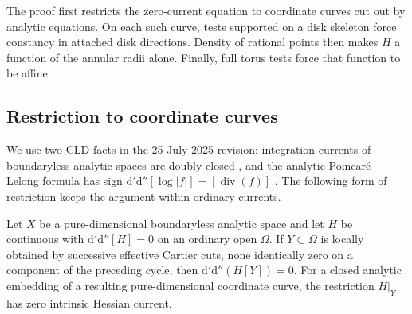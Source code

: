 The proof first restricts the zero-current equation to coordinate curves cut out by analytic equations. On each such curve, tests supported on a disk skeleton force constancy in attached disk directions. Density of rational points then makes $H$ a function of the annular radii alone. Finally, full torus tests force that function to be affine.

\subsection{Restriction to coordinate curves}\label{sec:supplied-p213-restriction}

We use two CLD facts in the 25 July 2025 revision: integration currents of boundaryless analytic spaces are doubly closed \cite[Proposition~7.7.9]{CLD25}, and the analytic Poincar\'e--Lelong formula has sign $\mathrm d'\mathrm d''[\log|f|]=[\operatorname{div}(f)]$ \cite[Theorem~16.7.3]{CLD25}. The following form of restriction keeps the argument within ordinary currents.

\begin{lemma}\label{lem:supplied-p213-cartier-restriction}
Let $X$ be a pure-dimensional boundaryless analytic space and let $H$ be continuous with $\mathrm d'\mathrm d''[H]=0$ on an ordinary open $\Omega$. If $Y\subset\Omega$ is locally obtained by successive effective Cartier cuts, none identically zero on a component of the preceding cycle, then $\mathrm d'\mathrm d''(H[Y])=0$. For a closed analytic embedding of a resulting pure-dimensional coordinate curve, the restriction $H|_Y$ has zero intrinsic Hessian current.
\end{lemma}

